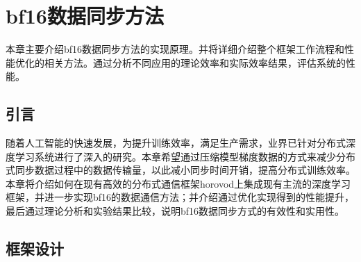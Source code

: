\chapter{bf16数据同步方法}
本章主要介绍bf16数据同步方法的实现原理。并将详细介绍整个框架工作流程和性能优化的相关方法。通过分析不同应用的理论效率和实际效率结果，评估系统的性能。
\section{引言}
随着人工智能的快速发展，为提升训练效率，满足生产需求，业界已针对分布式深度学习系统进行了深入的研究。本章希望通过压缩模型梯度数据的方式来减少分布式同步数据过程中的数据传输量，以此减小同步时间开销，提高分布式训练效率。本章将介绍如何在现有高效的分布式通信框架horovod上集成现有主流的深度学习框架，并进一步实现bf16的数据通信方法；并介绍通过优化实现得到的性能提升，最后通过理论分析和实验结果比较，说明bf16数据同步方式的有效性和实用性。
\section{框架设计}
